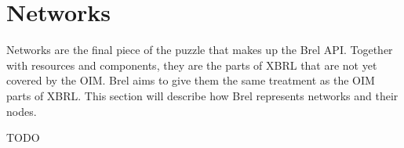 \section{Networks}
\label{sec:api_networks}

Networks are the final piece of the puzzle that makes up the Brel API.
Together with resources and components, they are the parts of XBRL that are not yet covered by the OIM.
Brel aims to give them the same treatment as the OIM parts of XBRL.
This section will describe how Brel represents networks and their nodes.

TODO